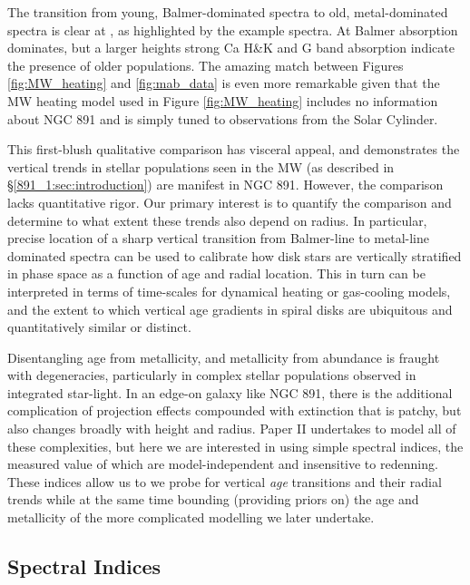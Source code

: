 
The transition from young, Balmer-dominated spectra to
old, metal-dominated spectra is clear at , as
highlighted by the example spectra. At  Balmer
absorption dominates, but a larger heights strong Ca H\&K and G band
absorption indicate the presence of older populations.  The amazing
match between Figures \ref{fig:MW_heating} and \ref{fig:mab_data} is
even more remarkable given that the MW heating model used in Figure
\ref{fig:MW_heating} includes no information about NGC 891 and is
simply tuned to observations from the Solar Cylinder.

This first-blush qualitative comparison has visceral appeal, and
demonstrates the vertical trends in stellar populations seen in the MW
(as described in \S\ref{891_1:sec:introduction}) are manifest in NGC
891. However, the comparison lacks quantitative rigor.  Our primary
interest is to quantify the comparison and determine to what extent
these trends also depend on radius. In particular, precise location of
a sharp vertical transition from Balmer-line to metal-line dominated
spectra can be used to calibrate how disk stars are vertically
stratified in phase space as a function of age and radial
location. This in turn can be interpreted in terms of time-scales for
dynamical heating or gas-cooling models, and the extent to which
vertical age gradients in spiral disks are ubiquitous and
quantitatively similar or distinct.

Disentangling age from metallicity, and metallicity from abundance is
fraught with degeneracies, particularly in complex stellar populations
observed in integrated star-light. In an edge-on galaxy like NGC 891,
there is the additional complication of projection effects compounded
with extinction that is patchy, but also changes broadly with height
and radius. Paper II undertakes to model all of these complexities,
but here we are interested in using simple spectral indices, the
measured value of which are model-independent and insensitive to
redenning. These indices allow us to we probe for vertical {\it age}
transitions and their radial trends while at the same time bounding
(providing priors on) the age and metallicity of the more complicated
modelling we later undertake.

\subsection{Spectral Indices}
\label{891_1:sec:indices}

